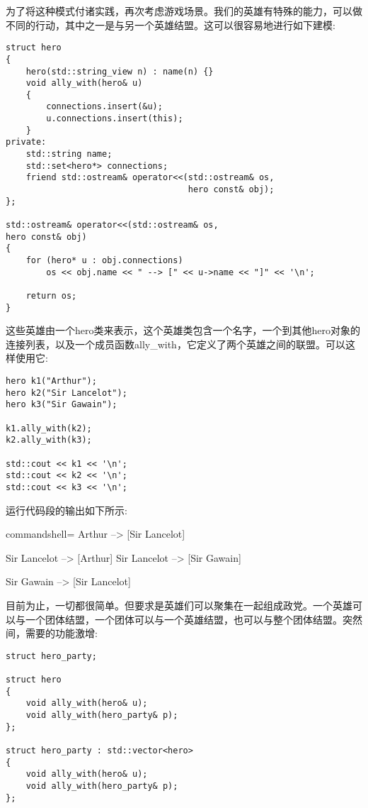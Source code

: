 为了将这种模式付诸实践，再次考虑游戏场景。我们的英雄有特殊的能力，可以做不同的行动，其中之一是与另一个英雄结盟。这可以很容易地进行如下建模:

\begin{lstlisting}[style=styleCXX]
struct hero
{
	hero(std::string_view n) : name(n) {}
	void ally_with(hero& u)
	{
		connections.insert(&u);
		u.connections.insert(this);
	}
private:
	std::string name;
	std::set<hero*> connections;
	friend std::ostream& operator<<(std::ostream& os,
									hero const& obj);
};

std::ostream& operator<<(std::ostream& os,
hero const& obj)
{
	for (hero* u : obj.connections)
		os << obj.name << " --> [" << u->name << "]" << '\n';
		
	return os;
}
\end{lstlisting}

这些英雄由一个hero类来表示，这个英雄类包含一个名字，一个到其他hero对象的连接列表，以及一个成员函数ally\_with，它定义了两个英雄之间的联盟。可以这样使用它:

\begin{lstlisting}[style=styleCXX]
hero k1("Arthur");
hero k2("Sir Lancelot");
hero k3("Sir Gawain");

k1.ally_with(k2);
k2.ally_with(k3);

std::cout << k1 << '\n';
std::cout << k2 << '\n';
std::cout << k3 << '\n';
\end{lstlisting}

运行代码段的输出如下所示:

\begin{tcblisting}{commandshell={}}
Arthur --> [Sir Lancelot]

Sir Lancelot --> [Arthur]
Sir Lancelot --> [Sir Gawain]

Sir Gawain --> [Sir Lancelot]
\end{tcblisting}

目前为止，一切都很简单。但要求是英雄们可以聚集在一起组成政党。一个英雄可以与一个团体结盟，一个团体可以与一个英雄结盟，也可以与整个团体结盟。突然间，需要的功能激增:

\begin{lstlisting}[style=styleCXX]
struct hero_party;

struct hero
{
	void ally_with(hero& u);
	void ally_with(hero_party& p);
};

struct hero_party : std::vector<hero>
{
	void ally_with(hero& u);
	void ally_with(hero_party& p);
};
\end{lstlisting}

